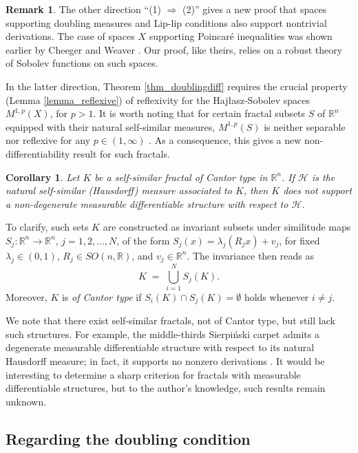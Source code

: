 \documentclass[reqno]{amsart}
\theoremstyle{plain}
\newtheorem{cor}[thm]{Corollary}
\theoremstyle{definition}
\newtheorem{rmk}[thm]{Remark}
\theoremstyle{remark}
\numberwithin{equation}{section}
\renewcommand{\H}{\mathcal{H}}
\newcommand{\R}{\mathbb{R}}
\begin{document}
\begin{rmk}
The other direction ``(1) $\Rightarrow$ (2)'' gives a new proof that spaces supporting doubling measures and Lip-lip conditions also support nontrivial derivations.  The case of spaces $X$ supporting Poincar\'e inequalities was shown earlier by Cheeger and Weaver \cite[Thm 43]{WeaverED}.  Our proof, like theirs, relies on a robust theory of Sobolev functions on such spaces. 
\end{rmk}

In the latter direction, Theorem \ref{thm_doublingdiff} requires the crucial property (Lemma \ref{lemma_reflexive}) of reflexivity for the Haj{\l}asz-Sobolev spaces $M^{1,p}(X)$, for $p > 1$.  It is worth noting that for certain fractal subsets $S$ of $\R^n$ equipped with their natural self-similar measures, $M^{1,p}(S)$ is neither separable nor reflexive for any $p \in (1,\infty)$ \cite{Rissanen}.  As a consequence, this gives a new non-differentiability result for such fractals.

\begin{cor}
Let $K$ be a self-similar fractal of Cantor type in $\R^n$.  If $\H$ is the natural self-similar (Hausdorff) measure associated to $K$, then $K$ does not support a non-degenerate measurable differentiable structure with respect to $\H$.
\end{cor}

To clarify, such sets $K$ are constructed as invariant subsets under similitude maps $S_j : \R^n \to \R^n$, $j = 1, 2, \ldots, N$, of the form
$S_j(x) = \lambda_j (R_jx) + v_j$,
for fixed $\lambda_j \in (0,1)$, $R_j \in SO(n,\R)$, and $v_j \in \R^n$.  The invariance then reads as
$$
K \;=\; \bigcup_{i=1}^N S_j(K).
$$
Moreover, $K$ is {\em of Cantor type} if $S_i(K) \cap S_j(K) = \emptyset$ holds whenever $i \neq j$.

We note that there exist self-similar fractals, not of Cantor type, but still lack such structures.  For example, the middle-thirds Sierpi\'nski carpet admits a degenerate measurable differentiable structure with respect to its natural Hausdorff measure; in fact, it supports no nonzero derivations \cite[Thm 41]{WeaverED}.  It would be interesting to determine a sharp criterion for fractals with measurable differentiable structures, but to the author's knowledge, such results remain unknown.

\subsection{Regarding the doubling condition}
\end{document}
